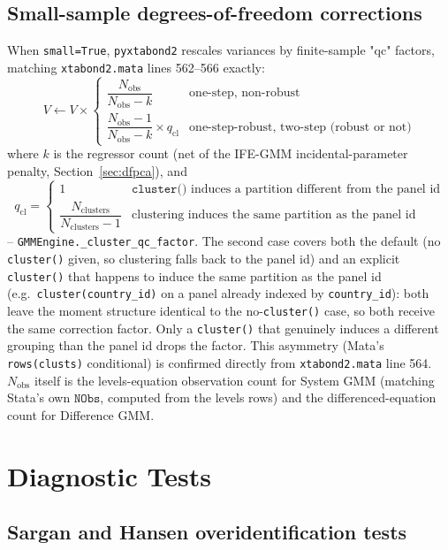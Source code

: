 \documentclass[11pt,a4paper]{article}
\newcommand{\pkg}{\texttt{pyxtabond2}}
\begin{document}
\subsection{Small-sample degrees-of-freedom corrections}
\label{sec:qc}

When \texttt{small=True}, \pkg{} rescales variances by finite-sample "qc"
factors, matching \texttt{xtabond2.mata} lines 562--566 exactly:
\[
  V \leftarrow V\times
  \begin{cases}
    \dfrac{N_{\mathrm{obs}}}{N_{\mathrm{obs}}-k} & \text{one-step, non-robust}\\[1.4ex]
    \dfrac{N_{\mathrm{obs}}-1}{N_{\mathrm{obs}}-k}\times q_{\mathrm{cl}} & \text{one-step-robust, two-step (robust or not)}
  \end{cases}
\]
where $k$ is the regressor count (net of the IFE-GMM incidental-parameter
penalty, Section~\ref{sec:dfpca}), and
\[
  q_{\mathrm{cl}} = \begin{cases}
    1 & \texttt{cluster()} \text{ induces a partition different from the panel id}\\
    \dfrac{N_{\mathrm{clusters}}}{N_{\mathrm{clusters}}-1} & \text{clustering induces the same partition as the panel id}
  \end{cases}
\]
-- \texttt{GMMEngine.\_cluster\_qc\_factor}. The second case covers both the
default (no \texttt{cluster()} given, so clustering falls back to the panel
id) and an explicit \texttt{cluster()} that happens to induce the same
partition as the panel id (e.g.\ \texttt{cluster(country\_id)} on a panel
already indexed by \texttt{country\_id}): both leave the moment structure
identical to the no-\texttt{cluster()} case, so both receive the same
correction factor. Only a \texttt{cluster()} that genuinely induces a
different grouping than the panel id drops the factor. This asymmetry
(Mata's \texttt{rows(clusts)} conditional) is confirmed directly from
\texttt{xtabond2.mata} line 564. $N_{\mathrm{obs}}$ itself
is the levels-equation observation count for System GMM (matching Stata's
own $\mathtt{NObs}$, computed from the levels rows) and the differenced-equation
count for Difference GMM.

\section{Diagnostic Tests}
\label{sec:diag}

\subsection{Sargan and Hansen overidentification tests}
\end{document}
